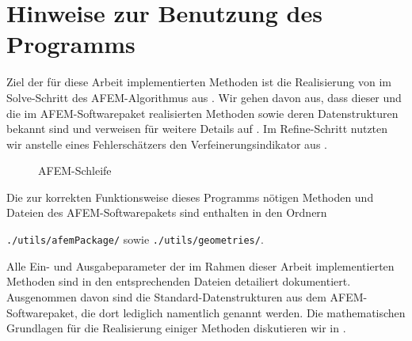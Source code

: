 
\section{Hinweise zur Benutzung des Programms}
Ziel der für diese Arbeit implementierten Methoden ist die Realisierung von
 im Solve-Schritt des AFEM-Algorithmus aus
. 
Wir gehen davon aus, dass dieser und die im
AFEM-Softwarepaket realisierten Methoden sowie deren Datenstrukturen bekannt
sind und verweisen für weitere Details auf \cite{CGKNRR10}. 
Im Refine-Schritt nutzten wir anstelle eines Fehlerschätzers den
Verfeinerungsindikator aus .
\begin{figure}[h]
  \centering
  
  \caption{AFEM-Schleife}
  \label{fig:afemLoop}
\end{figure}
Die zur korrekten Funktionsweise dieses Programms nötigen Methoden und
Dateien des AFEM-Softwarepakets sind enthalten in den Ordnern
\begin{center}
    \texttt{./utils/afemPackage/} sowie \texttt{./utils/geometries/}.
\end{center}
Alle Ein- und Ausgabeparameter der im Rahmen dieser Arbeit implementierten
Methoden sind in den entsprechenden Dateien detailiert dokumentiert. 
Ausgenommen davon sind die Standard-Datenstrukturen aus dem AFEM-Softwarepaket,
die dort lediglich namentlich genannt werden.
Die mathematischen Grundlagen für die Realisierung einiger Methoden diskutieren
wir in .

